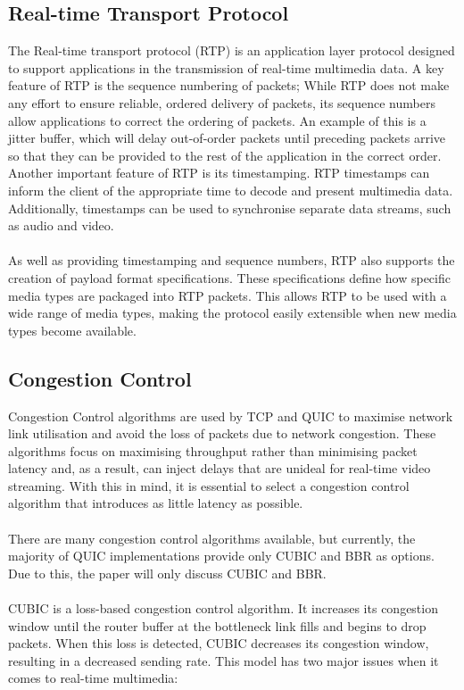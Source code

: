\documentclass{mpaper}
\begin{document}
\subsection{Real-time Transport Protocol} \label{Real-time Transport Protocol}

\noindent The Real-time transport protocol (RTP) is an application layer protocol designed to support applications in the transmission of real-time multimedia data\cite{RTP}. A key feature of RTP is the sequence numbering of packets; While RTP does not make any effort to ensure reliable, ordered delivery of packets, its sequence numbers allow applications to correct the ordering of packets. An example of this is a jitter buffer, which will delay out-of-order packets until preceding packets arrive so that they can be provided to the rest of the application in the correct order. Another important feature of RTP is its timestamping. RTP timestamps can inform the client of the appropriate time to decode and present multimedia data. Additionally, timestamps can be used to synchronise separate data streams, such as audio and video.
\\\\
As well as providing timestamping and sequence numbers, RTP also supports the creation of payload format specifications. These specifications define how specific media types are packaged into RTP packets. This allows RTP to be used with a wide range of media types, making the protocol easily extensible when new media types become available. 


\subsection{Congestion Control} \label{Congestion Control}

\noindent Congestion Control algorithms are used by TCP and QUIC to maximise network link utilisation and avoid the loss of packets due to network congestion. These algorithms focus on maximising throughput rather than minimising packet latency and, as a result, can inject delays that are unideal for real-time video streaming. With this in mind, it is essential to select a congestion control algorithm that introduces as little latency as possible.
\\\\
There are many congestion control algorithms available, but currently, the majority of QUIC implementations provide only CUBIC\cite{CUBIC} and BBR\cite{BBR} as options. Due to this, the paper will only discuss CUBIC and BBR.
\\\\
CUBIC is a loss-based congestion control algorithm. It increases its congestion window until the router buffer at the bottleneck link fills and begins to drop packets. When this loss is detected, CUBIC decreases its congestion window, resulting in a decreased sending rate. This model has two major issues when it comes to real-time multimedia: 
\end{document}
